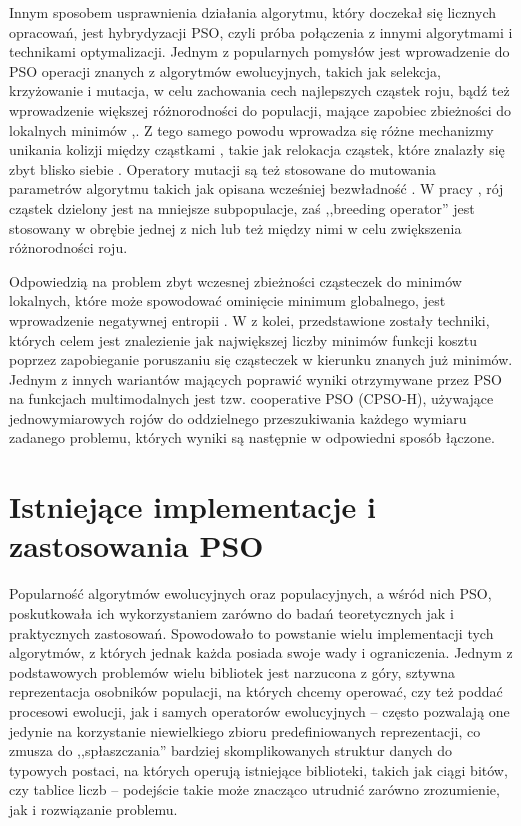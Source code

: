 \documentclass[12pt, twoside, openany, abstract=on]{report}
\theoremstyle{definition}
\begin{document}
Innym sposobem usprawnienia działania algorytmu, który doczekał się licznych opracowań, jest hybrydyzacji PSO, czyli próba połączenia z innymi algorytmami i technikami optymalizacji. Jednym z popularnych pomysłów jest wprowadzenie do PSO operacji znanych z algorytmów ewolucyjnych, takich jak selekcja, krzyżowanie i mutacja, w celu zachowania cech najlepszych cząstek roju, bądź też wprowadzenie większej różnorodności do populacji, mające zapobiec zbieżności do lokalnych minimów \cite{SelectionPso},\cite{HybridPsoBreedingSubpop}. Z tego samego powodu wprowadza się różne mechanizmy unikania kolizji między cząstkami \cite{CollisionAvoiding}, takie jak relokacja cząstek, które znalazły się zbyt blisko siebie \cite{PsoCriticality}. Operatory mutacji są też stosowane do mutowania 
 parametrów algorytmu takich jak opisana wcześniej bezwładność \cite{EPso}. W pracy \cite{HybridPsoBreedingSubpop}, rój cząstek dzielony jest na mniejsze subpopulacje, zaś ,,breeding operator'' 
  jest stosowany w obrębie jednej z nich lub też między nimi w celu zwiększenia różnorodności roju. 
  
  Odpowiedzią na problem zbyt wczesnej zbieżności cząsteczek do minimów lokalnych, które może spowodować ominięcie minimum globalnego, jest wprowadzenie negatywnej entropii \cite{DissipativePso}. W \cite{ComputGlobOptPso} z kolei, przedstawione zostały techniki, których celem jest znalezienie jak największej liczby minimów funkcji kosztu poprzez zapobieganie poruszaniu się cząsteczek w kierunku znanych już minimów.
Jednym z innych wariantów mających poprawić wyniki otrzymywane przez PSO na funkcjach multimodalnych 
 jest tzw. cooperative PSO (CPSO-H), używające jednowymiarowych rojów do oddzielnego przeszukiwania każdego wymiaru zadanego problemu, których wyniki są następnie w odpowiedni sposób łączone.

\section{Istniejące implementacje i zastosowania PSO}


Popularność algorytmów ewolucyjnych oraz populacyjnych, a wśród nich PSO, poskutkowała ich wykorzystaniem zarówno do badań teoretycznych jak i praktycznych zastosowań. Spowodowało to powstanie wielu implementacji tych algorytmów, z których jednak każda posiada swoje wady i ograniczenia. Jednym z podstawowych problemów wielu bibliotek jest narzucona z góry, sztywna reprezentacja osobników populacji, na których chcemy operować, czy też poddać procesowi ewolucji, jak i samych operatorów ewolucyjnych – często pozwalają one jedynie na korzystanie niewielkiego zbioru predefiniowanych reprezentacji, co zmusza do ,,spłaszczania'' bardziej skomplikowanych struktur danych do typowych postaci, na których operują istniejące biblioteki, takich jak ciągi bitów, czy tablice liczb – podejście takie może znacząco utrudnić zarówno zrozumienie, jak i rozwiązanie problemu.
\end{document}
